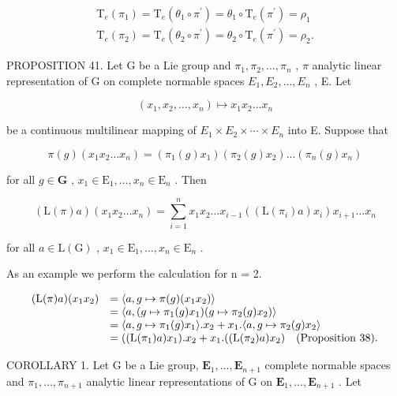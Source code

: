 \[
\begin{array}{l} \mathrm{T} _ {e} (\pi_ {1}) = \mathrm{T} _ {e} (\theta_ {1} \circ \pi^ {\prime}) = \theta_ {1} \circ \mathrm{T} _ {e} (\pi^ {\prime}) = \rho_ {1} \\ \mathrm{T} _ {e} (\pi_ {2}) = \mathrm{T} _ {e} (\theta_ {2} \circ \pi^ {\prime}) = \theta_ {2} \circ \mathrm{T} _ {e} (\pi^ {\prime}) = \rho_ {2}. \end{array}
\]

PROPOSITION 41. Let G be a Lie group and \(\pi_1, \pi_2, \ldots, \pi_n\) , \(\pi\) analytic linear representation of G on complete normable spaces \(E_1, E_2, \ldots, E_n\) , E. Let

\[
\left(x _ {1}, x _ {2}, \dots , x _ {n}\right) \mapsto x _ {1} x _ {2} \dots x _ {n}
\]

be a continuous multilinear mapping of \(E_{1} \times E_{2} \times \cdots \times E_{n}\) into E. Suppose that

\[
\pi (g) \left(x _ {1} x _ {2} \dots x _ {n}\right) = \left(\pi_ {1} (g) x _ {1}\right) \left(\pi_ {2} (g) x _ {2}\right) \dots \left(\pi_ {n} (g) x _ {n}\right)
\]

for all \(g \in \mathbf{G}\) , \(x_{1} \in \mathrm{E}_{1}, \ldots, x_{n} \in \mathrm{E}_{n}\) . Then

\[
(\mathrm{L} (\pi) a) (x _ {1} x _ {2} \dots x _ {n}) = \sum_ {i = 1} ^ {n} x _ {1} x _ {2} \dots x _ {i - 1} ((\mathrm{L} (\pi_ {i}) a) x _ {i}) x _ {i + 1} \dots x _ {n}
\]

for all \(a \in \mathrm{L}(\mathrm{G})\) , \(x_1 \in \mathrm{E}_1, \ldots, x_n \in \mathrm{E}_n\) .

As an example we perform the calculation for n = 2.

\[
\begin{array}{l l} (\mathrm{L} (\pi) a) (x _ {1} x _ {2}) & = \langle a, g \mapsto \pi (g) (x _ {1} x _ {2}) \rangle \\ & = \langle a, (g \mapsto \pi_ {1} (g) x _ {1}) (g \mapsto \pi_ {2} (g) x _ {2}) \rangle \\ & = \langle a, g \mapsto \pi_ {1} (g) x _ {1} \rangle . x _ {2} + x _ {1}. \langle a, g \mapsto \pi_ {2} (g) x _ {2} \rangle \\ & = ((\mathrm{L} (\pi_ {1}) a) x _ {1}). x _ {2} + x _ {1}. ((\mathrm{L} (\pi_ {2}) a) x _ {2}) \quad \text {(Proposition 38).} \end{array}
\]

COROLLARY 1. Let G be a Lie group, \(\mathbf{E}_1,\ldots ,\mathbf{E}_{n + 1}\) complete normable spaces and \(\pi_1,\dots ,\pi_{n + 1}\) analytic linear representations of G on \(\mathbf{E}_1,\dots ,\mathbf{E}_{n + 1}\) . Let

